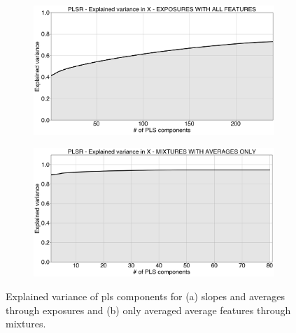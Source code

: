 \begin{figure}[!htb]
	\centering
	
	\begin{subfigure}[t]{0.5\textwidth}
		\includegraphics[width=1\linewidth]{../figures/pls-explained-variance.png}
		\caption{}
		\label{fig:pls-exp-var} 
	\end{subfigure}
	
	\begin{subfigure}[t]{0.5\textwidth}
		\includegraphics[width=1\linewidth]{../figures/pls-explained-variance-avg-feat.png}
		\caption{}
		\label{fig:pls-exp-var-avg-feat}
	\end{subfigure}
	
	\caption{Explained variance of \acrshort{pls} components for (a) slopes and averages through exposures and (b) only averaged average features through mixtures.}
	\label{fig:pls-exp-var-both}
\end{figure}


